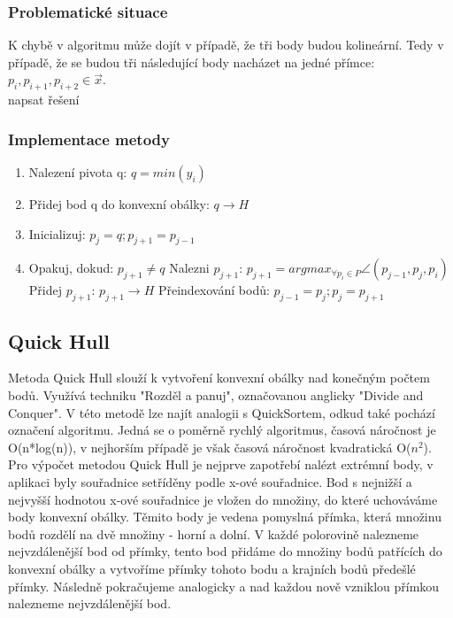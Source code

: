 \documentclass[a4paper, 12pt]{article}
\begin{document}
\subsubsection{Problematické situace}
K chybě v algoritmu může dojít v případě, že tři body budou kolineární. Tedy v případě, že se budou tři následující body nacházet na jedné přímce:  $ p_i, p_{i+1}, p_{i+2} \in \vec{x} $.
\\
napsat řešení 



\subsubsection{Implementace metody}
\begin{enumerate}
\item Nalezení pivota q:  $ q = min(y_i) $ 
\item Přidej bod q do konvexní obálky:  $ q \rightarrow H  $ 
\item Inicializuj: $p_j = q; p_{j+1} = p_{j-1}$
\item Opakuj, dokud: $ p_{j+1} \ne q $
\subitem Nalezni $p_{j+1}$: $ p_{j+1} = arg  max_{\forall p_i \in P}  \angle (p_{j-1}, p_j, p_i)$
\subitem Přidej $p_{j+1}$: $ p_{j+1} \rightarrow H  $
\subitem Přeindexování bodů: $ p_{j-1} = p_j; p_j = p_{j+1}  $
\end{enumerate}

\subsection{Quick Hull}
Metoda Quick Hull slouží k vytvoření konvexní obálky nad konečným počtem bodů. Využívá techniku "Rozděl a panuj", označovanou anglicky "Divide and Conquer". V této metodě lze najít analogii s QuickSortem, odkud také pochází označení algoritmu. Jedná se o poměrně rychlý algoritmus, časová náročnost je O(n*log(n)), v nejhorším případě je však časová náročnost kvadratická O($n^2$). \\

Pro výpočet metodou Quick Hull je nejprve zapotřebí nalézt extrémní body, v aplikaci byly souřadnice setříděny podle x-ové souřadnice. Bod s nejnižší a nejvyšší hodnotou x-ové souřadnice je vložen do množiny, do které uchováváme body konvexní obálky. Těmito body je vedena pomyslná přímka, která množinu bodů rozdělí na dvě množiny - horní a dolní. V každé polorovině nalezneme nejvzdálenější bod od přímky, tento bod přidáme do množiny bodů patřících do konvexní obálky a vytvoříme přímky tohoto bodu a krajních bodů předešlé přímky. Následně pokračujeme analogicky a nad každou nově vzniklou přímkou nalezneme nejvzdálenější bod.
\end{document}
